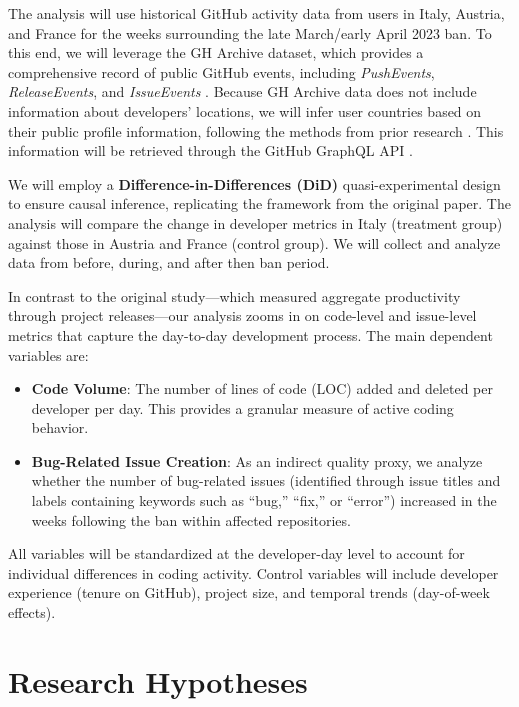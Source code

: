 The analysis will use historical GitHub activity data from users in Italy, Austria, and France for the weeks surrounding the late March/early April 2023 ban. To this end, we will leverage the GH Archive dataset, which provides a comprehensive record of public GitHub events, including \textit{PushEvents}, \textit{ReleaseEvents}, and \textit{IssueEvents} \cite{github_archive}. Because GH Archive data does not include information about developers’ locations, we will infer user countries based on their public profile information, following the methods from prior research \cite{Kreitmeir2023}. This information will be retrieved through the GitHub GraphQL API \cite{github_graphql_api}.

We will employ a \textbf{Difference-in-Differences (DiD)} quasi-experimental design to ensure causal inference, replicating the framework from the original paper. The analysis will compare the change in developer metrics in Italy (treatment group) against those in Austria and France (control group). We will collect and analyze data from before, during, and after then ban period.

In contrast to the original study—which measured aggregate productivity through project releases—our analysis zooms in on code-level and issue-level metrics that capture the day-to-day development process. The main dependent variables are:

\begin{itemize}
  \item \textbf{Code Volume}: The number of lines of code (LOC) added and deleted per developer per day. This provides a granular measure of active coding behavior.
  \item \textbf{Bug-Related Issue Creation}: As an indirect quality proxy, we analyze whether the number of bug-related issues (identified through issue titles and labels containing keywords such as “bug,” “fix,” or “error”) increased in the weeks following the ban within affected repositories.
\end{itemize}

All variables will be standardized at the developer-day level to account for individual differences in coding activity. Control variables will include developer experience (tenure on GitHub), project size, and temporal trends (day-of-week effects).


\section*{Research Hypotheses}

